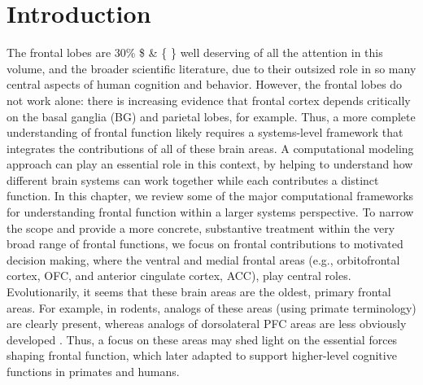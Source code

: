 \documentclass[11pt,twoside]{article}
\newif\myifpdf
\begin{document}


\titlesamepageoc{\mytitle}{\myauthor}{\mynote}{\myabstract}



\pagestyle{myheadings}

\section{Introduction}

The frontal lobes are 30\% \$ \& \{ \} well deserving of all the attention in this volume, and the broader scientific literature, due to their outsized role in so many central aspects of human cognition and behavior.  However, the frontal lobes do not work alone: there is increasing evidence that frontal cortex depends critically on the basal ganglia (BG) and parietal lobes, for example.  Thus, a more complete understanding of frontal function likely requires a systems-level framework that integrates the contributions of all of these brain areas.  A computational modeling approach can play an essential role in this context, by helping to understand how different brain systems can work together while each contributes a distinct function.  In this chapter, we review some of the major computational frameworks for understanding frontal function within a larger systems perspective.  To narrow the scope and provide a more concrete, substantive treatment within the very broad range of frontal functions, we focus on frontal contributions to motivated decision making, where the ventral and medial frontal areas (e.g., orbitofrontal cortex, OFC, and anterior cingulate cortex, ACC), play central roles.  Evolutionarily, it seems that these brain areas are the oldest, primary frontal areas.  For example, in rodents, analogs of these areas (using primate terminology) are clearly present, whereas analogs of dorsolateral PFC areas are less obviously developed \cite[e.g.,]{BrownBowman02,UylingsGroenewegenKolb03,OngurPrice00}.  Thus, a focus on these areas may shed light on the essential forces shaping frontal function, which later adapted to support higher-level cognitive functions in primates and humans.
\end{document}
